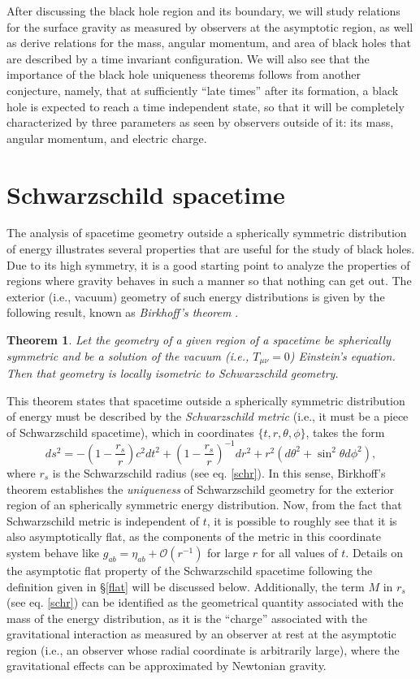 \documentclass[
12pt,		%
openright,	%
twoside,  %
a4paper,			%
chapter=TITLE,		%
english,			%
french,				%
spanish,			%
brazil				%
]{USPSC-classe/USPSC}
\newtheorem{theorem}{Theorem}[section]
\begin{document}
After discussing the black hole region and its boundary, we will study relations for the surface gravity as measured by observers at the asymptotic region, as well as derive relations for the mass, angular momentum, and area of black holes that are described by a time invariant configuration. We will also see that the importance of the black hole uniqueness theorems follows from another conjecture, namely, that at sufficiently ``late times'' after its formation, a black hole is expected to reach a time independent state, so that it will be completely characterized by three parameters as seen by observers outside of it: its mass, angular momentum, and electric charge.

\section{Schwarzschild spacetime}\label{schsec}
The analysis of spacetime geometry outside a spherically symmetric distribution of energy illustrates several properties that are useful for the study of black holes. Due to its high symmetry, it is a good starting point to analyze the properties of regions where gravity behaves in such a manner so that nothing can get out. The exterior (i.e., vacuum) geometry of such energy distributions is given by the following result, known as \textit{Birkhoff's theorem} \cite{Misner1973}.\begin{theorem}
Let the geometry of a given region of a spacetime be spherically symmetric and be a solution of the vacuum (i.e., $T_{\mu\nu}=0$) Einstein's equation. Then that geometry is locally isometric to Schwarzschild geometry.
\end{theorem}

This theorem states that spacetime outside a spherically symmetric distribution of energy must be described by the \textit{Schwarzschild metric} (i.e., it must be a piece of Schwarzschild spacetime), which in coordinates $\{t,r,\theta,\phi\}$, takes the form
\begin{equation}\label{sch}
    ds^2=-\left(1-\frac{r_s}{r}\right)c^2dt^2+\left(1-\frac{r_s}{r}\right)^{-1}dr^2+r^2(d\theta^2+\sin^2\theta d\phi^2),
\end{equation}
where $r_s$ is the Schwarzschild radius (see eq. \ref{schr}). In this sense, Birkhoff's theorem establishes the \textit{uniqueness} of Schwarzschild geometry for the exterior region of an spherically symmetric energy distribution. Now, from the fact that Schwarzschild metric is independent of $t$, it is possible to roughly see that it is also asymptotically flat, as the components of the metric in this coordinate system behave like $g_{ab}=\eta_{ab}+\mathcal{O}(r^{-1})$ for large $r$ for all values of $t$. Details on the asymptotic flat property of the Schwarzschild spacetime following the definition given in \S\;\ref{flat} will be discussed below. Additionally, the term $M$ in $r_s$ (see eq. \ref{schr}) can be identified as the geometrical quantity associated with the mass of the energy distribution, as it is the “charge” associated with the gravitational interaction as measured by an observer at rest at the asymptotic region (i.e., an observer whose radial coordinate is arbitrarily large), where the gravitational effects can be approximated by Newtonian gravity.
\end{document}
